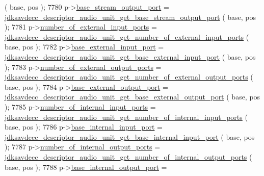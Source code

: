 \begin{DoxyCode}
      ( base, pos );
7780         p->\hyperlink{structjdksavdecc__descriptor__audio__unit_a234b990d7bb2f22da0ba4bebadc71a70}{base\_stream\_output\_port} = 
      \hyperlink{group__descriptor__audio_ga4f952ffca35b65123411eb3258c5cec9}{jdksavdecc\_descriptor\_audio\_unit\_get\_base\_stream\_output\_port}
      ( base, pos );
7781         p->\hyperlink{structjdksavdecc__descriptor__audio__unit_a7e5320abe3b528f879c3314a19269335}{number\_of\_external\_input\_ports} = 
      \hyperlink{group__descriptor__audio_gafd249e4d2a03beb274250b75e9f6b2ef}{jdksavdecc\_descriptor\_audio\_unit\_get\_number\_of\_external\_input\_ports}
      ( base, pos );
7782         p->\hyperlink{structjdksavdecc__descriptor__audio__unit_a292b30d547e9769f7ec471a9e26ae2c2}{base\_external\_input\_port} = 
      \hyperlink{group__descriptor__audio_gaf59ae0e612901bfe1b2c7d1ff8f9a072}{jdksavdecc\_descriptor\_audio\_unit\_get\_base\_external\_input\_port}
      ( base, pos );
7783         p->\hyperlink{structjdksavdecc__descriptor__audio__unit_ae7140af180c1c9cc1f5a6a414fe26ebb}{number\_of\_external\_output\_ports} = 
      \hyperlink{group__descriptor__audio_ga6abf5fd015a87121a7a06af5b7dd4cf3}{jdksavdecc\_descriptor\_audio\_unit\_get\_number\_of\_external\_output\_ports}
      ( base, pos );
7784         p->\hyperlink{structjdksavdecc__descriptor__audio__unit_a3103a3898813f4104c1d1d7f984e8229}{base\_external\_output\_port} = 
      \hyperlink{group__descriptor__audio_ga918686b5830f24704cfa3e8669256ec6}{jdksavdecc\_descriptor\_audio\_unit\_get\_base\_external\_output\_port}
      ( base, pos );
7785         p->\hyperlink{structjdksavdecc__descriptor__audio__unit_af14e1056175671f086901f07420bf46f}{number\_of\_internal\_input\_ports} = 
      \hyperlink{group__descriptor__audio_ga3cd9996d50664f9501fba6dff2835b57}{jdksavdecc\_descriptor\_audio\_unit\_get\_number\_of\_internal\_input\_ports}
      ( base, pos );
7786         p->\hyperlink{structjdksavdecc__descriptor__audio__unit_a11d926248b31db1ff60e6416c9c3d996}{base\_internal\_input\_port} = 
      \hyperlink{group__descriptor__audio_gad0999b21ae1bfa305283ea182062d33b}{jdksavdecc\_descriptor\_audio\_unit\_get\_base\_internal\_input\_port}
      ( base, pos );
7787         p->\hyperlink{structjdksavdecc__descriptor__audio__unit_aeba303ee329974d2a1c3ff9b5b41ed4b}{number\_of\_internal\_output\_ports} = 
      \hyperlink{group__descriptor__audio_ga1de6c495fd0b6f7fc154195e65a4e293}{jdksavdecc\_descriptor\_audio\_unit\_get\_number\_of\_internal\_output\_ports}
      ( base, pos );
7788         p->\hyperlink{structjdksavdecc__descriptor__audio__unit_a238f1b0f1c8556b5e9586d93541169a5}{base\_internal\_output\_port} = 

\end{DoxyCode}
